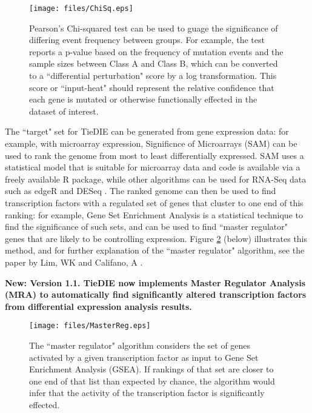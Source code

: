 \documentclass[11pt]{report}
\begin{document}
\begin{figure}[h]
    \texttt{[image: files/ChiSq.eps]}
	\caption{Pearson's Chi-squared test can be used to guage the significance of differing event frequency between groups. For example, the test reports a p-value based
	on the frequency of mutation events and the sample sizes between Class A and Class B, which can be converted to a ``differential perturbation" score by a log transformation. This score or ``input-heat" should represent the relative confidence that each gene is mutated or otherwise functionally effected in the dataset of interest.}
    \label{fig:chisq}
\end{figure}

\clearpage

\noindent The ``target" set for TieDIE can be generated from gene expression data: for example, with microarray expression, Significnce of Microarrays (SAM) \cite{SAM} can be used to rank the genome from most to least differentially expressed. SAM uses a statistical model that is suitable for microarray data and code is available via a freely available R package, while other algorithms can be used for RNA-Seq data
such as edgeR \cite{edgeR} and DESeq \cite{DESeq}. The ranked genome can then be used to find transcription factors with a regulated 
set of genes that cluster to one end of this ranking: for example, Gene Set Enrichment Analysis \cite{Subramanian05} is a statistical 
technique to find the significance of such sets, and can be used to find ``master regulator" genes that are likely to be controlling expression. Figure \ref{fig:masterreg} (below) illustrates this method, and for further explanation of the ``master regulator" algorithm, see the paper by Lim, WK and Califano, A \cite{MR_Califano}. 

\noindent \bf{New: Version 1.1}. TieDIE now implements Master Regulator Analysis (MRA) \cite{MR_Califano} to automatically find significantly altered transcription factors from differential expression analysis results. 


\begin{figure}[h]
    \texttt{[image: files/MasterReg.eps]}
	\caption{The ``master regulator" algorithm considers the set of genes activated by a given transcription factor as input to Gene Set Enrichment Analysis (GSEA). If rankings
	of that set are closer to one end of that list than expected by chance, the algorithm would infer that the activity of the transcription factor is significantly effected.} 
    \label{fig:masterreg}
\end{figure}
\end{document}
